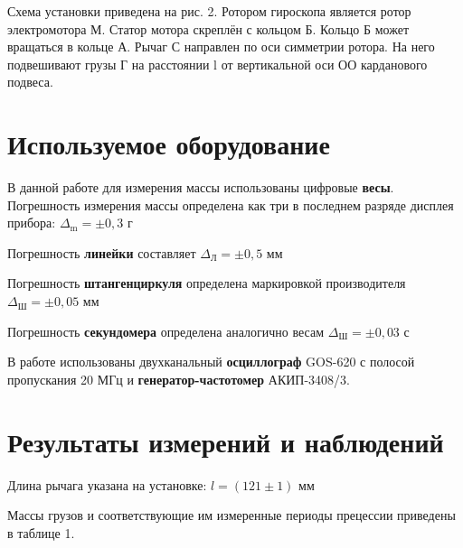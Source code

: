 \documentclass{article}
\begin{document}
 Схема установки приведена на рис. 2. Ротором гироскопа является ротор электромотора М. Статор мотора скреплён с кольцом Б. Кольцо Б может вращаться в кольце А. Рычаг С направлен по оси симметрии ротора. На него подвешивают грузы Г на расстоянии l от вертикальной оси ОО карданового подвеса.


\section*{Используемое оборудование}

\hspace{4mm} В данной работе для измерения массы использованы цифровые \textbf{весы}. Погрешность измерения массы определена как три в последнем разряде дисплея прибора: $\Delta_{\text{m}} = \pm 0,3$ г

Погрешность \textbf{линейки} составляет $\Delta_{\text{Л}} = \pm 0,5$ мм 

Погрешность \textbf{штангенциркуля} определена маркировкой производителя $\Delta_{\text{Ш}} = \pm 0,05$ мм 

Погрешность \textbf{секундомера} определена аналогично весам $\Delta_{\text{Ш}} = \pm 0,03$ с 

В работе использованы двухканальный \textbf{осциллограф} GOS-620 с полосой пропускания 20 МГц и \textbf{генератор-частотомер} АКИП-3408/3.

\section*{Результаты измерений и наблюдений}

\hspace{4mm} Длина рычага указана на установке: $l = (121 \pm 1)$ мм

Массы грузов и соответствующие им измеренные периоды прецессии приведены в таблице 1.
\begin{table}[h!]
	\centering

\end{table}%
\end{document}
